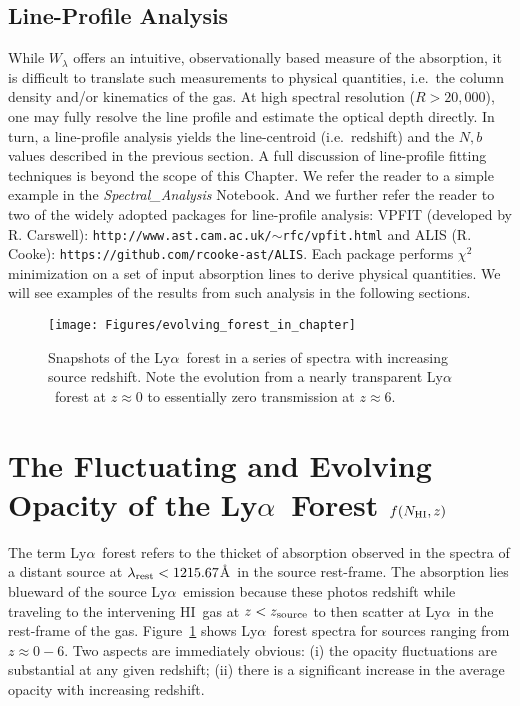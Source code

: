 \documentclass[graybox]{svmult}
\newcommand{\HI}{H{\sc I}}
\def\lya{Ly$\alpha$}
\newcommand{\mnhi}{N_{\rm HI}}
\begin{document}
\subsection{Line-Profile Analysis}

While $W_\lambda$ offers an intuitive, observationally based
measure of the absorption, it is difficult to translate
such measurements to physical quantities, i.e.\ the column
density and/or kinematics of the gas.  At high spectral
resolution ($R > 20,000$), one may fully resolve
the line profile and estimate the optical depth directly.
In turn, a line-profile analysis yields the line-centroid
(i.e.\ redshift) and the $N,b$ values described in the
previous section.
A full discussion of line-profile fitting techniques is
beyond the scope of this Chapter.  We refer the reader
to a simple example in the {\it Spectral\_Analysis} Notebook.
And we further refer the reader to two of the widely adopted
packages for line-profile analysis:
VPFIT (developed by R. Carswell):  {\tt http://www.ast.cam.ac.uk/$\sim$rfc/vpfit.html}
and ALIS (R. Cooke): {\tt https://github.com/rcooke-ast/ALIS}.
Each package performs $\chi^2$ minimization on a set of
input absorption lines to derive physical quantities.
We will see examples of the results from such analysis in the
following sections.


\begin{figure}[ht]
\sidecaption
\texttt{[image: Figures/evolving\_forest\_in\_chapter]}
%
%
\caption{Snapshots of the \lya\ forest in a series of spectra
with increasing source redshift.  Note the evolution from a nearly
transparent \lya\ forest at $z \approx 0$ to essentially 
zero transmission at $z \approx 6$.
}
\label{fig:lyf_z}       %
\end{figure}

\clearpage

\section{The Fluctuating and Evolving Opacity of the
\lya\ Forest $f(\mnhi,z)$}

The term \lya\ forest refers to the thicket of absorption
observed in the spectra of a distant source at 
$\lambda_{\rm rest} < 1215.67$\AA\ in the source rest-frame.
The absorption lies blueward of the source \lya\ emission
because these photos redshift while traveling to the
intervening \HI\ gas at $z < z_{\rm source}$ to then
scatter at \lya\ in the rest-frame of the gas.
Figure~\ref{fig:lyf_z} shows \lya\ forest spectra for
sources ranging from $z \approx 0-6$.  Two aspects are
immediately obvious: 
(i) the opacity fluctuations are substantial at any given
redshift;
(ii) there is a significant increase in the average opacity
with increasing redshift.  
\end{document}
